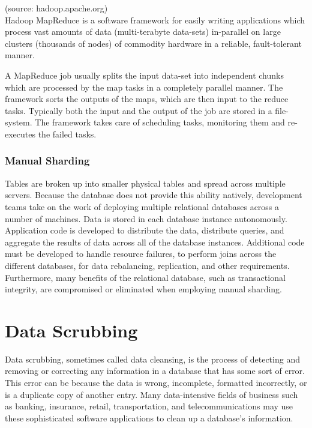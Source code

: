 \documentclass[12pt]{article}
\begin{document}
\bigskip
(source: hadoop.apache.org)\\
Hadoop MapReduce is a software framework for easily writing applications which process vast amounts of data (multi-terabyte data-sets) in-parallel on large clusters (thousands of nodes) of commodity hardware in a reliable, fault-tolerant manner.

A MapReduce job usually splits the input data-set into independent chunks which are processed by the map tasks in a completely parallel manner. The framework sorts the outputs of the maps, which are then input to the reduce tasks. Typically both the input and the output of the job are stored in a file-system. The framework takes care of scheduling tasks, monitoring them and re-executes the failed tasks.


\subsubsection{Manual Sharding}

Tables are broken up into smaller physical tables and spread across multiple servers. Because the database does not provide this ability natively, development teams take on the work of deploying multiple relational databases across a number of machines. Data is stored in each database instance autonomously. Application code is developed to distribute the data, distribute queries, and aggregate the results of data across all of the database instances. Additional code must be developed to handle resource failures, to perform joins across the different databases, for data rebalancing, replication, and other requirements. Furthermore, many benefits of the relational database, such as transactional integrity, are compromised or eliminated when employing manual sharding.



\section{Data Scrubbing}

Data scrubbing, sometimes called data cleansing, is the process of detecting and removing or correcting any information in a database that has some sort of error. This error can be because the data is wrong, incomplete, formatted incorrectly, or is a duplicate copy of another entry. Many data-intensive fields of business such as banking, insurance, retail, transportation, and telecommunications may use these sophisticated software applications to clean up a database's information.
\end{document}
